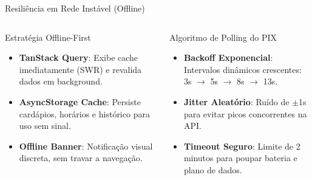 \documentclass[10pt, aspectratio=169]{beamer}
\begin{document}
\begin{frame}{Resiliência em Rede Instável (Offline)}
  \begin{columns}[T,onlytextwidth]
      \begin{block}{Estratégia Offline-First}
        \small
        \begin{itemize}
          \item \textbf{TanStack Query}: Exibe cache imediatamente (SWR) e revalida dados em background.
          \item \textbf{AsyncStorage Cache}: Persiste cardápios, horários e histórico para uso sem sinal.
          \item \textbf{Offline Banner}: Notificação visual discreta, sem travar a navegação.
        \end{itemize}
      \end{block}

      \begin{alertblock}{Algoritmo de Polling do PIX}
        \small
        \begin{itemize}
          \item \textbf{Backoff Exponencial}: Intervalos dinâmicos crescentes: 3s $\to$ 5s $\to$ 8s $\to$ 13s.
          \item \textbf{Jitter Aleatório}: Ruído de $\pm$1s para evitar picos concorrentes na API.
          \item \textbf{Timeout Seguro}: Limite de 2 minutos para poupar bateria e plano de dados.
        \end{itemize}
      \end{alertblock}
  \end{columns}
\end{frame}
\end{document}
